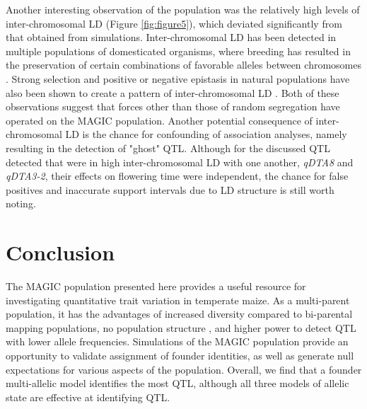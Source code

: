 \documentclass[article,9pt,twocolumn,twoside]{rilabRxiv}
\begin{document}
Another interesting observation of the population was the relatively high levels of inter-chromosomal LD (Figure \ref{fig:figure5}), which deviated significantly from that obtained from simulations.
Inter-chromosomal LD has been detected in multiple populations of domesticated organisms, where breeding has resulted in the preservation of certain combinations of favorable alleles between chromosomes \citep{Robbins,MalyshevaOtto}.
Strong selection and positive or negative epistasis in natural populations have also been shown to create a pattern of inter-chromosomal LD \citep{Kulminski,Gupta,Hench,Petkov}.
Both of these observations suggest that forces other than those of random segregation have operated on the MAGIC population.
Another potential consequence of inter-chromosomal LD is the chance for confounding of association analyses, namely resulting in the detection of "ghost" QTL.
Although for the discussed QTL detected that were in high inter-chromosomal LD with one another, \emph{qDTA8} and \emph{qDTA3-2}, their effects on flowering time were independent, the chance for false positives and inaccurate support intervals due to LD structure is still worth noting.

\section{Conclusion}
The MAGIC population presented here provides a useful resource for investigating quantitative trait variation in temperate maize.
As a multi-parent population, it has the advantages of increased diversity compared to bi-parental mapping populations, no population structure , and higher power to detect QTL with lower allele frequencies.
Simulations of the MAGIC population provide an opportunity to validate assignment of founder identities, as well as generate null expectations for various aspects of the population.
Overall, we find that a founder multi-allelic model identifies the most QTL, although all three models of allelic state are effective at identifying QTL.
\end{document}
